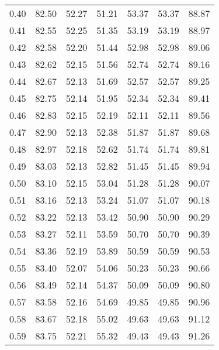 \begin{tabular}{|c|c|c|c|c|c|c|}
      0.40 &     82.50 &     52.27 &      51.21 &   53.37 &      53.37 &         88.87 \\
      0.41 &     82.55 &     52.25 &      51.35 &   53.19 &      53.19 &         88.97 \\
      0.42 &     82.58 &     52.20 &      51.44 &   52.98 &      52.98 &         89.06 \\
      0.43 &     82.62 &     52.15 &      51.56 &   52.74 &      52.74 &         89.16 \\
      0.44 &     82.67 &     52.13 &      51.69 &   52.57 &      52.57 &         89.25 \\
      0.45 &     82.75 &     52.14 &      51.95 &   52.34 &      52.34 &         89.41 \\
      0.46 &     82.83 &     52.15 &      52.19 &   52.11 &      52.11 &         89.56 \\
      0.47 &     82.90 &     52.13 &      52.38 &   51.87 &      51.87 &         89.68 \\
      0.48 &     82.97 &     52.18 &      52.62 &   51.74 &      51.74 &         89.81 \\
      0.49 &     83.03 &     52.13 &      52.82 &   51.45 &      51.45 &         89.94 \\
      0.50 &     83.10 &     52.15 &      53.04 &   51.28 &      51.28 &         90.07 \\
      0.51 &     83.16 &     52.13 &      53.24 &   51.07 &      51.07 &         90.18 \\
      0.52 &     83.22 &     52.13 &      53.42 &   50.90 &      50.90 &         90.29 \\
      0.53 &     83.27 &     52.11 &      53.59 &   50.70 &      50.70 &         90.39 \\
      0.54 &     83.36 &     52.19 &      53.89 &   50.59 &      50.59 &         90.53 \\
      0.55 &     83.40 &     52.07 &      54.06 &   50.23 &      50.23 &         90.66 \\
      0.56 &     83.49 &     52.14 &      54.37 &   50.09 &      50.09 &         90.80 \\
      0.57 &     83.58 &     52.16 &      54.69 &   49.85 &      49.85 &         90.96 \\
      0.58 &     83.67 &     52.18 &      55.02 &   49.63 &      49.63 &         91.12 \\
      0.59 &     83.75 &     52.21 &      55.32 &   49.43 &      49.43 &         91.26 \\

\end{tabular}
